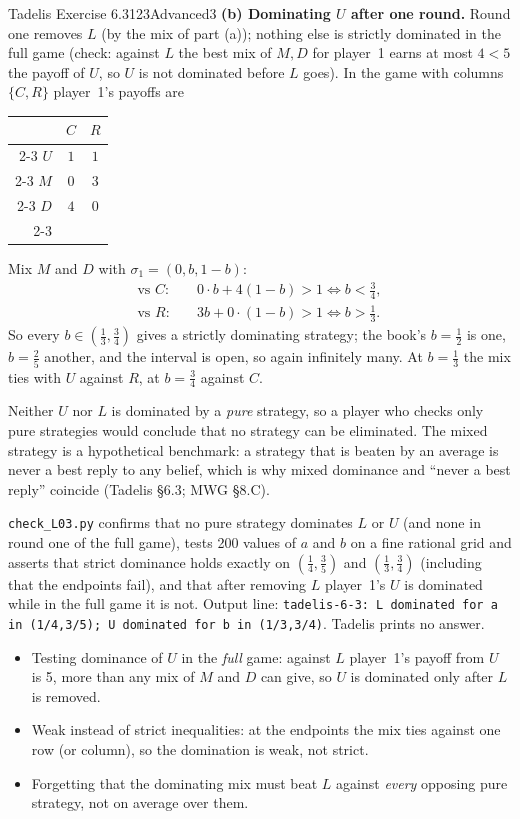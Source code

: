 \begin{exsol}{Tadelis Exercise 6.3}{123}{Advanced}{3}
\textbf{(b) Dominating $U$ after one round.} Round one removes $L$ (by the mix of part (a)); nothing
else is strictly dominated in the full game (check: against $L$ the best mix of $M, D$ for player~1
earns at most $4 < 5$ the payoff of $U$, so $U$ is not dominated before $L$ goes). In the game with
columns $\{C, R\}$ player~1's payoffs are
\begin{center}
\begin{tabular}{r|c|c|}
\multicolumn{1}{r}{} & \multicolumn{1}{c}{$C$} & \multicolumn{1}{c}{$R$}\\ \cline{2-3}
$U$ & $1$ & $1$ \\ \cline{2-3}
$M$ & $0$ & $3$ \\ \cline{2-3}
$D$ & $4$ & $0$ \\ \cline{2-3}
\end{tabular}
\end{center}
Mix $M$ and $D$ with $\sigma_1 = (0, b, 1-b)$:
\begin{align*}
  \text{vs } C:&\quad 0\cdot b + 4(1-b) > 1 \iff b < \tfrac34,\\
  \text{vs } R:&\quad 3b + 0\cdot(1-b) > 1 \iff b > \tfrac13 .
\end{align*}
So every $b \in (\frac13, \frac34)$ gives a strictly dominating strategy; the book's $b = \frac12$ is
one, $b = \frac25$ another, and the interval is open, so again infinitely many. At $b = \frac13$ the mix
ties with $U$ against $R$, at $b = \frac34$ against $C$.

\interp Neither $U$ nor $L$ is dominated by a \emph{pure} strategy, so a player who checks only pure
strategies would conclude that no strategy can be eliminated. The mixed strategy is a hypothetical
benchmark: a strategy that is beaten by an average is never a best reply to any belief, which is why
mixed dominance and ``never a best reply'' coincide (Tadelis \S6.3; MWG \S8.C).

\verify \texttt{check\_L03.py} confirms that no pure strategy dominates $L$ or $U$ (and none in
round one of the full game), tests 200 values of $a$ and $b$ on a fine rational grid and asserts that
strict dominance holds exactly on $(\frac14,\frac35)$ and $(\frac13,\frac34)$ (including that the
endpoints fail), and that after removing $L$ player~1's $U$ is dominated while in the full game it is
not. Output line: \texttt{tadelis-6-3: L dominated for a in (1/4,3/5); U dominated for b in
(1/3,3/4)}. Tadelis prints no answer.

\mistakes
\begin{itemize}
  \item Testing dominance of $U$ in the \emph{full} game: against $L$ player~1's payoff from $U$ is 5, more
  than any mix of $M$ and $D$ can give, so $U$ is dominated only after $L$ is removed.
  \item Weak instead of strict inequalities: at the endpoints the mix ties against one row (or column), so
  the domination is weak, not strict.
  \item Forgetting that the dominating mix must beat $L$ against \emph{every} opposing pure strategy,
  not on average over them.
\end{itemize}


\end{exsol}
